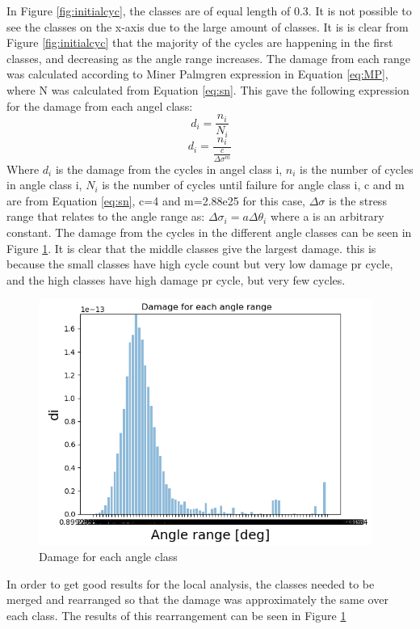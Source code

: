 \noindent In Figure \ref{fig:initialcyc}, the classes are of equal length of 0.3. It is not possible to see the classes on the x-axis due to the large amount of classes. It is is clear from Figure \ref{fig:initialcyc} that the majority of the cycles are happening in the first classes, and decreasing as the angle range increases.\newline
\newline
The damage from each range was calculated according to Miner Palmgren expression in Equation \ref{eq:MP}, where N was calculated from Equation \ref{eq:sn}. This gave the following expression for the damage from each angel class: 
\begin{equation}
    d_i  = \frac{n_i}{N_i}
\end{equation}
\begin{equation}
    d_i=\frac{n_i}{\frac{c}{\Delta \sigma ^m}}
\end{equation}
Where $d_i$ is the damage from the cycles in angel class i, $n_i$ is the number of cycles in angle class i, $N_i$ is the number of cycles until failure for angle class i, c and m are from Equation \ref{eq:sn}, c=4 and m=2.88e25 for this case,  $\Delta \sigma$ is the stress range that relates to the angle range as: $\Delta \sigma_i = a \Delta \theta_i$ where a is an arbitrary constant.\newline
\newline 
The damage from the cycles in the different angle classes can be seen in Figure \ref{fig:initialdam}. It is clear that the middle classes give the largest damage. this is because the small classes have high cycle count but very low damage pr cycle, and the high classes have high damage pr cycle, but very few cycles. 

\begin{figure}[H]
\centering
\includegraphics[scale=0.9]{figures/initialdam}
\caption[Damage for each angle class]{Damage for each angle class}
 \label{fig:initialdam}
\end{figure}
\noindent In order to get good results for the local analysis, the classes needed to be merged and rearranged so that the damage was approximately the same over each class. The results of this rearrangement can be seen in Figure \ref{fig:initialdam}

